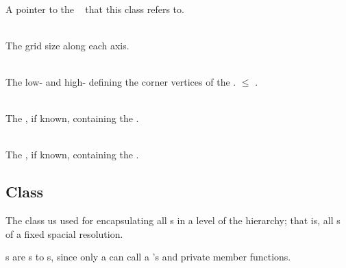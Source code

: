 \documentclass[11pt]{article}
\begin{document}
     \\ A pointer
    to the \enzo\  that this  class refers to.

     \\ The grid size along
    each axis.

     \\ The low- and
     high- defining the corner vertices of the .
      $\le$ .

     \\ The , if
     known, containing the .

     \\ The , if
     known, containing the .


% 
% 


 
\subsection{ Class} \label{s:level}

   The  class us used for encapsulating all s
   in a level of the hierarchy; that is, all s of
   a fixed spacial resolution.

   \umlLevel

   s are s to s, since only
   a  can call a 's  and
    private member functions.
\end{document}

